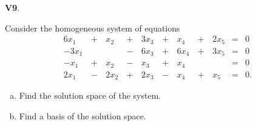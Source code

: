 \documentclass{article}
\newenvironment{problem}[1]
{
  \begin{flushleft}
  \textbf{#1}.
  \ignorespaces
}
{
  \end{flushleft}
}
\begin{document}
\begin{problem}{V9}
Consider the homogeneous system of equations
\begin{alignat*}{6}
x_1 &\,+\,& x_2 &\,+\,& 3x_3 &\,+\,& x_4 &\,+\,& 2x_5 &=& 0 \\
-3x_1 &\,\,&  &\,-\,& 6x_3 &\,+\,&6 x_4 &\,+\,& 3x_5 &=& 0 \\
-x_1 &\,+\,& x_2 &\,-\,& x_3 &\,+\,& x_4 &\,\,&  &=& 0 \\
2x_1 &\,-\,& 2x_2 &\,+\,& 2x_3 &\,-\,& x_4 &\,+\,& x_5 &=& 0 .
\end{alignat*}
\begin{enumerate}[(a)]
\item Find the solution space of the system.
\item Find a basis of the solution space.
\end{enumerate}
\end{problem}
\end{document}
